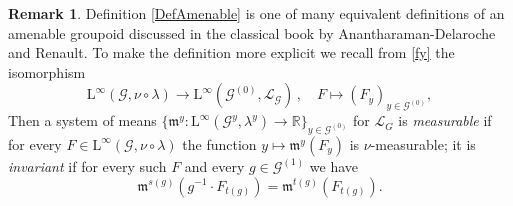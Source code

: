 \documentclass[11pt, oneside]{amsart}
\theoremstyle{definition}
\newtheorem{remark}[lemma]{Remark}
\theoremstyle{remark}
\theoremstyle{TheoremNum}
\renewcommand{\L}{\mathfrak}
\newcommand{\Linf}{\mathrm{L}^{\infty}}
\newcommand{\cG}{\mathcal{G}}
\newcommand{\cL}{\mathcal L}
\begin{document}
\begin{remark}
Definition \ref{DefAmenable} is one of many equivalent definitions of an amenable groupoid discussed in the classical book \cite{delaroche:renault:libro} by Anantharaman-Delaroche and Renault. To make the definition more explicit we recall from \eqref{fy} the isomorphism
\[
\Linf(\mathcal{G},\nu\circ \lambda)\to \Linf(\mathcal{G}^{(0)},\mathcal{L}_{\mathcal{G}})\,,\quad F \mapsto (F_y)_{y \in \cG^{(0)}},
\]
Then a system of means $\{\L m^y:\Linf(\mathcal{G}^y,\lambda^y)\to \mathbb{R}\}_{y\in \mathcal{G}^{(0)}}$ for $\cL_G$ is \emph{measurable} if for every $F \in \Linf(\mathcal{G},\nu\circ \lambda)$ the function $y \mapsto \L m^y(F_y)$ is $\nu$-measurable; it is \emph{invariant} if for every such $F$ and every $g\in \mathcal{G}^{(1)}$ we have
  \begin{equation}\label{eq:ISM}
    \L m^{s(g)} (g^{-1}\cdot F_{t(g)}) = \L m^{t(g)}(F_{t(g)}).
 \end{equation}
\end{remark}
\end{document}
